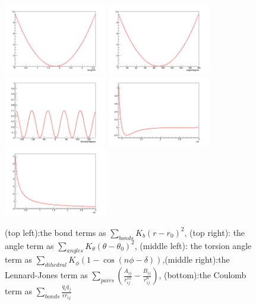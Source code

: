 \documentclass{article} %
\begin{document}
\begin{figure}[h!] 
\begin{center} 
\includegraphics[width=0.4\textwidth]{bond.png}
\includegraphics[width=0.4\textwidth]{angle.png}
\includegraphics[width=0.4\textwidth]{dihedral.png}
\includegraphics[width=0.4\textwidth]{pair.png}
\includegraphics[width=0.4\textwidth]{pair2.png}
\end{center}  
\caption{ (top left):the bond terms as $\sum_{bonds} K_b(r-r_0)^2$, (top right): the angle term as $\sum_{angles} K_{\theta}(\theta-\theta_0)^2$,
(middle left): the torsion angle term as $\sum_{dihedral} K_{\phi}(1-\cos(n\phi-\delta))$,(middle right):the Lennard-Jones term as $\sum_{pairs} (\frac{A_{ij}}{r^{12}_{ij}}-\frac{B_{ij}}{r^{6}_{ij}})$,
(bottom):the Coulomb term as $\sum_{bonds} \frac{q_iq_j}{\epsilon r_{ij}}$}
\label{fig:energy}
\end{figure} 
\end{document}
